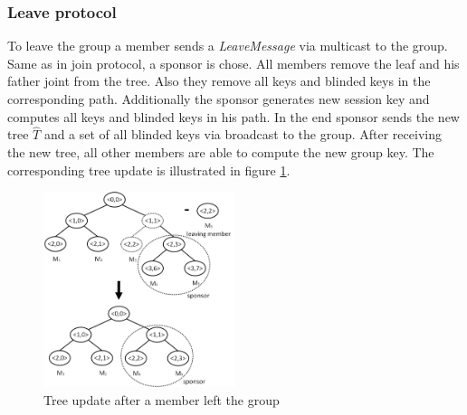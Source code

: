 \subsubsection{Leave protocol}
To leave the group a member sends a \textit{LeaveMessage} via multicast to the group. Same as in join protocol, a sponsor is chose. All members remove the leaf and his father joint from the tree. Also they remove all keys and blinded keys in the corresponding path. Additionally the sponsor generates new session key and computes all keys and blinded keys in his path. In the end sponsor sends the new tree $\widehat{T}$ and a set of all blinded keys via broadcast to the group. After receiving the new tree, all other members are able to compute the new group key. The corresponding tree update is illustrated in figure \ref{fig:tgdh_leave}.
\begin{figure}[!h]
\centering\includegraphics[width=0.5\textwidth]{Images/tgdh_leave}
\caption{Tree update after a member left the group}
\label{fig:tgdh_leave}
\end{figure}